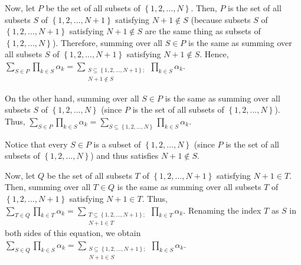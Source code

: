 \documentclass[numbers=enddot,12pt,final,onecolumn,notitlepage]{scrartcl}%
\begin{document}
Now, let $P$ be the set of all subsets of $\left\{  1,2,...,N\right\}  $.
Then, $P$ is the set of all subsets $S$ of $\left\{  1,2,...,N+1\right\}  $
satisfying $N+1\notin S$ (because subsets $S$ of $\left\{
1,2,...,N+1\right\}  $ satisfying $N+1\notin S$ are the same thing as subsets
of $\left\{  1,2,...,N\right\}  $). Therefore, summing over all $S\in P$ is
the same as summing over all subsets $S$ of $\left\{  1,2,...,N+1\right\}  $
satisfying $N+1\notin S$. Hence, $\sum\limits_{S\in P}\prod\limits_{k\in
S}\alpha_{k}=\sum\limits_{\substack{S\subseteq\left\{  1,2,...,N+1\right\}
;\\N+1\notin S}}\prod\limits_{k\in S}\alpha_{k}$.

On the other hand, summing over all $S\in P$ is the same as summing over all
subsets $S$ of $\left\{  1,2,...,N\right\}  $ (since $P$ is the set of all
subsets of $\left\{  1,2,...,N\right\}  $). Thus, $\sum\limits_{S\in P}%
\prod\limits_{k\in S}\alpha_{k}=\sum\limits_{S\subseteq\left\{
1,2,...,N\right\}  }\prod\limits_{k\in S}\alpha_{k}$.

Notice that every $S\in P$ is a subset of $\left\{  1,2,...,N\right\}  $
(since $P$ is the set of all subsets of $\left\{  1,2,...,N\right\}  $) and
thus satisfies $N+1\notin S$.

Now, let $Q$ be the set of all subsets $T$ of $\left\{  1,2,...,N+1\right\}  $
satisfying $N+1\in T$. Then, summing over all $T\in Q$ is the same as summing
over all subsets $T$ of $\left\{  1,2,...,N+1\right\}  $ satisfying $N+1\in
T$. Thus, $\sum\limits_{T\in Q}\prod\limits_{k\in T}\alpha_{k}=\sum
\limits_{\substack{T\subseteq\left\{  1,2,...,N+1\right\}  ;\\N+1\in T}%
}\prod\limits_{k\in T}\alpha_{k}$. Renaming the index $T$ as $S$ in both sides
of this equation, we obtain $\sum\limits_{S\in Q}\prod\limits_{k\in S}%
\alpha_{k}=\sum\limits_{\substack{S\subseteq\left\{  1,2,...,N+1\right\}
;\\N+1\in S}}\prod\limits_{k\in S}\alpha_{k}$.
\end{document}
